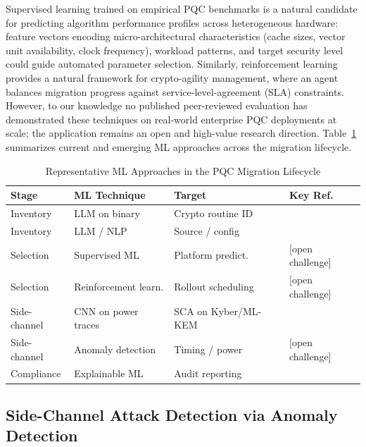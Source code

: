 \documentclass[journal]{IEEEtran}
\begin{document}
Supervised learning trained on empirical PQC benchmarks is a natural
candidate for predicting algorithm performance profiles across heterogeneous
hardware: feature vectors encoding micro-architectural characteristics
(cache sizes, vector unit availability, clock frequency), workload patterns,
and target security level could guide automated parameter selection.
Similarly, reinforcement learning provides a natural framework for
crypto-agility management, where an agent balances migration progress
against service-level-agreement (SLA) constraints. However, to our
knowledge no published peer-reviewed evaluation has demonstrated these
techniques on real-world enterprise PQC deployments at scale; the
application remains an open and high-value research direction.
Table~\ref{tab:ml_approaches} summarizes current and emerging ML approaches
across the migration lifecycle.

\begin{table}[!t]
\renewcommand{\arraystretch}{1.3}
\caption{Representative ML Approaches in the PQC Migration Lifecycle}
\label{tab:ml_approaches}
\centering
\small
\begin{tabular}{@{}p{1.5cm}p{1.8cm}p{1.5cm}p{1.8cm}@{}}
\toprule
\textbf{Stage} & \textbf{ML Technique} & \textbf{Target} & \textbf{Key Ref.} \\
\midrule
Inventory       & LLM on binary        & Crypto routine ID    & \cite{shang2025foc}           \\
Inventory       & LLM / NLP            & Source / config      & \cite{baek2024cryptollm}      \\
Selection       & Supervised ML        & Platform predict.    & [open challenge]              \\
Selection       & Reinforcement learn. & Rollout scheduling   & [open challenge]              \\
Side-channel    & CNN on power traces  & SCA on Kyber/ML-KEM  & \cite{ravi2023mlsca}          \\
Side-channel    & Anomaly detection    & Timing / power       & [open challenge]              \\
Compliance      & Explainable ML       & Audit reporting      & \cite{arrieta2020xai}         \\
\bottomrule
\end{tabular}
\end{table}

\subsection{Side-Channel Attack Detection via Anomaly Detection}
\label{subsec:sidechannel}
\end{document}
